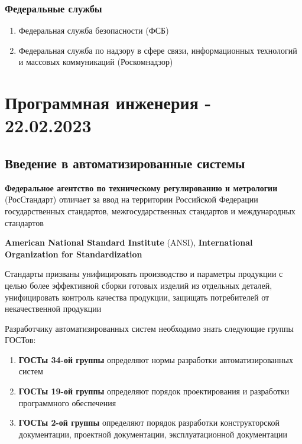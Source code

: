 \documentclass{article}
\begin{document}
\subsubsection{Федеральные службы}

\begin{enumerate}
    \item Федеральная служба безопасности (ФСБ)
    \item Федеральная служба по надзору в сфере связи, информационных технологий и массовых коммуникаций (Роскомнадзор)
\end{enumerate}

\pagebreak
\section{Программная инженерия - 22.02.2023}

\subsection{Введение в автоматизированные системы}

\textbf{Федеральное агентство по техническому регулированию и метрологии} (РосСтандарт) отличает за ввод на территории Российской Федерации государственных стандартов, межгосударственных стандартов и международных стандартов

\textbf{American National Standard Institute} (ANSI), \textbf{International Organization for Standardization}

\hfill

Стандарты призваны унифицировать производство и параметры продукции с целью более эффективной сборки готовых изделий из отдельных деталей, унифицировать контроль качества продукции, защищать потребителей от некачественной продукции

\hfill

Разработчику автоматизированных систем необходимо знать следующие группы ГОСТов:

\begin{enumerate}
    \item \textbf{ГОСТы 34-ой группы} определяют нормы разработки автоматизированных систем
    \item \textbf{ГОСТы 19-ой группы} определяют порядок проектирования и разработки программного обеспечения
    \item \textbf{ГОСТы 2-ой группы} определяют порядок разработки конструкторской документации, проектной документации, эксплуатационной документации
\end{enumerate}
\end{document}
